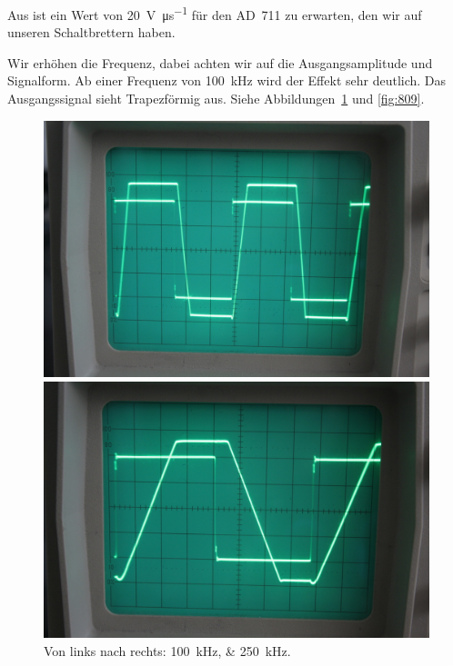 Aus \cite[Tabelle~5/6.1]{physik313-Anleitung} ist ein Wert von
\SI{20}{\volt\per\micro\second} für den AD~711 zu erwarten, den wir auf unseren
Schaltbrettern haben.

Wir erhöhen die Frequenz, dabei achten wir auf die Ausgangsamplitude und
Signalform. Ab einer Frequenz von \SI{100}{\kilo\hertz} wird der Effekt sehr
deutlich. Das Ausgangssignal sieht Trapezförmig aus. Siehe
Abbildungen~\ref{fig:807} und \ref{fig:809}.

\begin{figure}[htbp]
	\centering
	\begin{minipage}{.45\linewidth}
		\includegraphics[width=\linewidth]{Oszi_Foto/5-807.jpg}
	\end{minipage}
	\hfill
	\begin{minipage}{.45\linewidth}
		\includegraphics[width=\linewidth]{Oszi_Foto/5-808.jpg}
	\end{minipage}
	\caption{%
		Von links nach rechts: \SIlist{100;250}{\kilo\hertz}.
	}
	\label{fig:807}
\end{figure}

